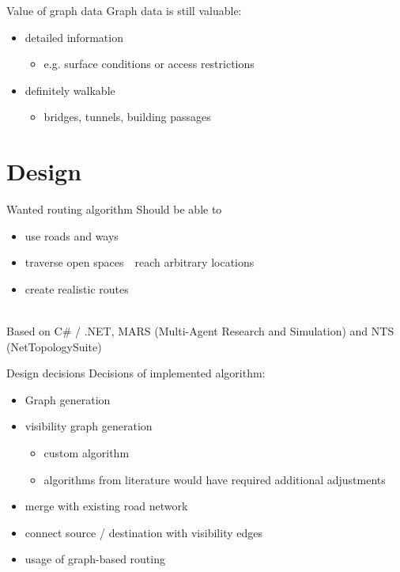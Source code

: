 \documentclass[xcolor={x11names}]{beamer}
\renewcommand{\n}{\hfill\\[0.5ex]}
\newcommand{\nn}{\hfill\\[2ex]}
\begin{document}
		\begin{frame}{Value of graph data}
			Graph data is still valuable:\n
			\begin{itemize}
				\item detailed information
				\begin{itemize}
					\item e.g. surface conditions or access restrictions
				\end{itemize}
				\item definitely walkable
				\begin{itemize}
					\item bridges, tunnels, building passages
				\end{itemize}
			\end{itemize}
		\end{frame}
	
	\section{Design}
	
		\begin{frame}{Wanted routing algorithm}
			Should be able to\n
			\begin{itemize}
				\item use roads and ways
				\item traverse open spaces\ \textrightarrow\ reach arbitrary locations
				\item create realistic routes
			\end{itemize}
			\nn
			\pause
			Based on C\# / .NET, MARS (Multi-Agent Research and Simulation) and NTS (NetTopologySuite)
		\end{frame}
		
		\begin{frame}{Design decisions}
			Decisions of implemented algorithm:\n
			\begin{itemize}
				\item Graph generation
				\item visibility graph generation
				\begin{itemize}
					\item custom algorithm
					\item algorithms from literature would have required additional adjustments
				\end{itemize}
				\item merge with existing road network
				\item connect source / destination with visibility edges
				\item usage of graph-based routing
			\end{itemize}
		\end{frame}
		
\end{document}
